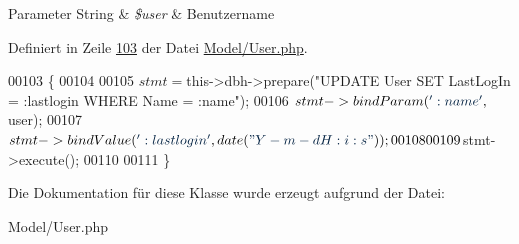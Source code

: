 \begin{DoxyParams}[1]{Parameter}
String & {\em \$user} & Benutzername \\
\hline
\end{DoxyParams}


Definiert in Zeile \hyperlink{_model_2_user_8php_source_l00103}{103} der Datei \hyperlink{_model_2_user_8php_source}{Model/\-User.\-php}.


\begin{DoxyCode}
00103                                                 \{
00104 
00105                 $stmt = $this->dbh->prepare(\textcolor{stringliteral}{"UPDATE User SET LastLogIn = :lastlogin WHERE Name = :name"});
00106                 $stmt->bindParam(\textcolor{stringliteral}{':name'}, $user);
00107                 $stmt->bindValue(\textcolor{stringliteral}{':lastlogin'}, date(\textcolor{stringliteral}{"Y-m-d H:i:s"}));
00108 
00109                 $stmt->execute();
00110                         
00111         \}
\end{DoxyCode}


Die Dokumentation für diese Klasse wurde erzeugt aufgrund der Datei\-:\begin{DoxyCompactItemize}
\item 
Model/\-User.\-php\end{DoxyCompactItemize}
